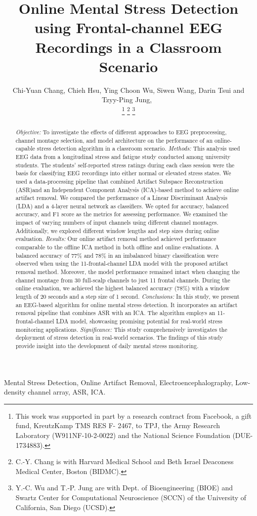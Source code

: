 \documentclass[journal]{IEEEtran}
\title{
Online Mental Stress Detection using Frontal-channel EEG Recordings in a Classroom Scenario
}
\author{
	Chi-Yuan Chang,
	Chieh Hsu,
        Ying Choon Wu,
        Siwen Wang,
        Darin Tsui
	and Tzyy-Ping Jung,~\IEEEmembership{Fellow,~IEEE}

\thanks{This work was supported in part by a research contract from Facebook, a gift fund, KreutzKamp TMS RES F- 2467, to TPJ,  the Army Research Laboratory (W911NF-10-2-0022) and the National Science Foundation (DUE-1734883).}
	\thanks{C.-Y. Chang is with Harvard Medical School and Beth Israel Deaconess Medical Center, Boston (BIDMC).}
     \thanks{Y.-C. Wu and T.-P. Jung are with Dept. of Bioengineering (BIOE) and Swartz Center for Computational Neuroscience (SCCN) of the University of California, San Diego (UCSD).}
}
\newcommand{\mc}[1]{\textcolor{red}{#1}}
\begin{document}
\maketitle
\thispagestyle{empty}
\pagestyle{empty}
\begin{abstract}

\textit{Objective:} To investigate the effects of different approaches to EEG preprocessing, channel montage selection, and model architecture on the performance of an online-capable stress detection algorithm in a classroom scenario.
\textit{Methods:} This analysis used EEG data from a longitudinal stress and fatigue study conducted among university students. The students' self-reported stress ratings during each class session were the basis for classifying EEG recordings into either normal or elevated stress states.
We used a data-processing pipeline that combined Artifact Subspace Reconstruction (ASR)and an Independent Component Analysis (ICA)-based method to achieve online artifact removal.
We compared the performance of a Linear Discriminant Analysis (LDA) and a 4-layer neural network as classifiers.
We opted for accuracy, balanced accuracy, and F1 score as the metrics for assessing performance.
We examined the impact of varying numbers of input channels using different channel montages. Additionally, we explored different window lengths and step sizes during online evaluation.
\textit{Results:} 
Our online artifact removal method achieved performance comparable to the offline ICA method in both offline and online evaluations.
A balanced accuracy of 77\% and 78\% in an imbalanced binary classification were observed when using the 11-frontal-channel LDA model with the proposed artifact removal method.
Moreover, the model performance remained intact when changing the channel montage from 30 full-scalp channels to just 11 frontal channels.
During the online evaluation, we achieved the highest balanced accuracy (78\%) with a window length of 20 seconds and a step size of 1 second.
\textit{Conclusions:} In this study, we present an EEG-based algorithm for online mental stress detection. It incorporates an artifact removal pipeline that combines ASR with an ICA.
The algorithm employs an 11-frontal-channel LDA model, showcasing promising potential for real-world stress monitoring applications.
\textit{Significance:} 
This study comprehensively investigates the deployment of stress detection in real-world scenarios.
The findings of this study provide insight into the development of daily mental stress monitoring.

\end{abstract}
\begin{IEEEkeywords}
Mental Stress Detection, Online Artifact Removal, Electroencephalography, Low-density channel array, ASR, ICA.
\end{IEEEkeywords}
\end{document}
